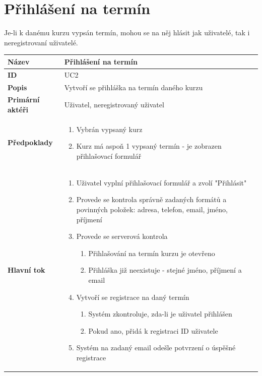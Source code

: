 \documentclass[12pt,a4paper,titlepage,final]{report}
\begin{document}
\section{Přihlášení na termín}
Je-li k danému kurzu vypsán termín, mohou se na něj hlásit jak uživatelé, tak i neregistrovaní uživatelé.
\begin{table}[!h]
\begin{center}
    \begin{tabular}{ | p{4.2cm} | p{12.2cm} | }
    \hline
    \textbf{Název} & Přihlášení na termín 
    \\ \hline
    
	\textbf{ID} & UC2
	\\ \hline
	
	\textbf{Popis} & Vytvoří se přihláška na termín daného kurzu
	\\ \hline
	    
	\textbf{Primární aktéři} & Uživatel, neregistrovaný uživatel
	\\ \hline
	
	\textbf{Předpoklady} & 
	\vspace{-3.5mm}
	\begin{enumerate}
		\itemsep0em 	
		\item Vybrán vypsaný kurz
		\item Kurz má aspoň 1 vypsaný termín - je zobrazen přihlašovací formulář
	\end{enumerate}
    \\ \hline
    
    \textbf{Hlavní tok} & 
    \vspace{-3.5mm}
	\begin{enumerate}
		\itemsep0em 	
		\item Uživatel vyplní přihlašovací formulář a zvolí "Přihlásit"
		\item Provede se kontrola správně zadaných formátů a povinných položek: adresa, telefon, email, jméno, příjmení
		\item Provede se serverová kontrola
		\begin{enumerate}
			\itemsep0em 		
			\item Přihlašování na termín kurzu je otevřeno
			\item Přihláška již neexistuje - stejné jméno, příjmení a email
		\end{enumerate}				
		\item Vytvoří se registrace na daný termín
		\begin{enumerate}
			\itemsep0em 		
			\item Systém zkontroluje, zda-li je uživatel přihlášen
			\item Pokud ano, přidá k registraci ID uživatele
		\end{enumerate}				
		\item Systém na zadaný email odešle potvrzení o úspěšné registrace
	\end{enumerate}   		
    \\ \hline
    	   

\end{tabular}
\end{center}
\end{table}
\end{document}
